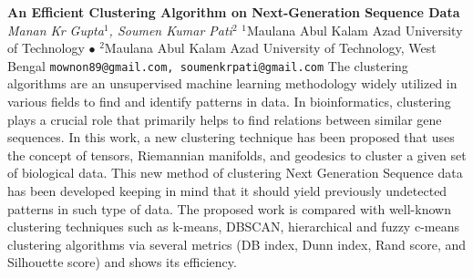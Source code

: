 
    \begin{conf-abstract}[]
        {\textbf{An Efficient Clustering Algorithm on Next-Generation Sequence Data}}
        {\textit{Manan Kr Gupta$^{1}$, Soumen  Kumar Pati$^{2}$}}
        {$^{1}$Maulana Abul Kalam Azad University of Technology $\bullet$ $^{2}$Maulana Abul Kalam Azad University of Technology, West Bengal}
        {\texttt{mownon89@gmail.com, soumenkrpati@gmail.com}}
        {The clustering algorithms are an unsupervised machine learning methodology widely utilized in various fields to find and identify patterns in data. In bioinformatics, clustering plays a crucial role that primarily helps to find relations between similar gene sequences. In this work, a new clustering technique has been proposed that uses the concept of tensors, Riemannian manifolds, and geodesics to cluster a given set of biological data. This new method of clustering Next Generation Sequence data has been developed keeping in mind that it should yield previously undetected patterns in such type of data. The proposed work is compared with well-known clustering techniques such as k-means, DBSCAN, hierarchical and fuzzy c-means clustering algorithms via several metrics (DB index, Dunn index, Rand score, and Silhouette score) and shows its efficiency.  }
    \end{conf-abstract}
        